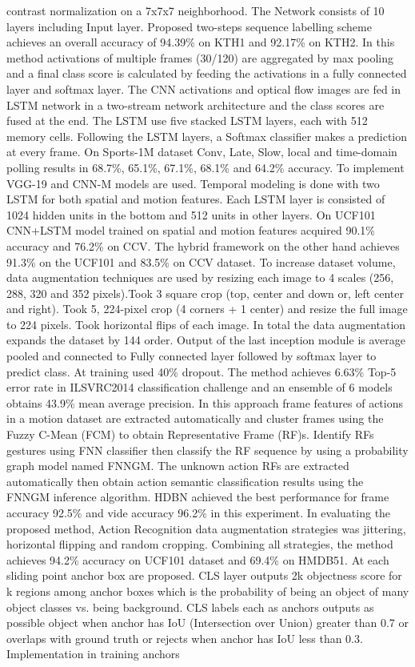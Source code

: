 \documentclass[11pt,english]{article}
\begin{document}
contrast normalization on a 7x7x7 neighborhood. The Network consists of 10 layers including Input layer. Proposed two-steps sequence labelling scheme achieves an overall accuracy of 94.39\% on KTH1 and 92.17\% on KTH2. \citep{yue2015beyond} In this method activations of multiple frames (30/120) are aggregated by max pooling and a final class score is calculated by feeding the activations in a fully connected layer and softmax layer. The CNN activations and optical flow images are fed in LSTM network in a two-stream network architecture and the class scores are fused at the end. The LSTM use five stacked LSTM layers, each with 512 memory cells. Following the LSTM layers, a Softmax classifier makes a prediction at every frame. On Sports-1M dataset Conv, Late, Slow, local and time-domain polling results in 68.7\%,  65.1\%,  67.1\%, 68.1\% and 64.2\% accuracy. To implement \citep{wu2015modeling} VGG-19 and CNN-M models are used. Temporal modeling is done with two LSTM for both spatial and motion features. Each LSTM layer is consisted of 1024 hidden units in the bottom and 512 units in other layers. On UCF101 CNN+LSTM model trained on spatial and motion features acquired 90.1\% accuracy and 76.2\% on CCV. The hybrid framework on the other hand achieves 91.3\% on the UCF101 and 83.5\% on CCV dataset. \citep{szegedy2015going} To increase dataset volume, data augmentation techniques are used by resizing each image to 4 scales (256, 288, 320 and 352 pixels).Took 3 square crop (top, center and down or, left center and right). Took 5, 224-pixel crop (4 corners + 1 center) and resize the full image to 224 pixels. Took horizontal flips of each image. In total the data augmentation expands the dataset by 144 order. Output of the last inception module is average pooled and connected to Fully connected layer followed by softmax layer to predict class. At training used 40\% dropout. The method achieves 6.63\% Top-5 error rate in ILSVRC2014 classification challenge and an ensemble of 6 models obtains 43.9\% mean average precision. \citep{xiao2017action} In this approach frame features of actions in a motion dataset are extracted automatically and cluster frames using the Fuzzy C-Mean (FCM) to obtain Representative Frame (RF)s. Identify RFs gestures using FNN classifier then classify the RF sequence by using a probability graph model named FNNGM. The unknown action RFs are extracted automatically then obtain action semantic classification results using the FNNGM inference algorithm. HDBN achieved the best performance for frame accuracy 92.5\% and vide accuracy 96.2\% in this experiment. In evaluating the proposed method, \citep{wang2016temporal} Action Recognition data augmentation strategies was jittering, horizontal flipping and random cropping. Combining all strategies, the method achieves 94.2\% accuracy on UCF101 dataset and 69.4\% on HMDB51. \citep{he2016deep} At each sliding point anchor box are proposed. CLS layer outputs 2k objectness score for k regions among anchor boxes which is the probability of being an object of many object classes vs. being background. CLS labels each as anchors outputs as possible object when anchor has IoU (Intersection over Union) greater than 0.7 or overlaps with ground truth or rejects when anchor has IoU less than 0.3. Implementation in training anchors 
\end{document}
